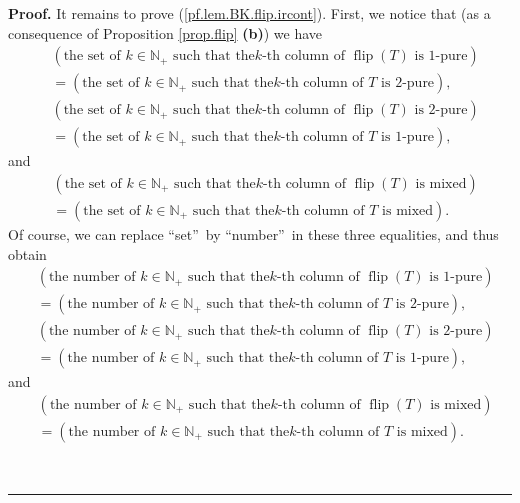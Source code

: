 \documentclass[numbers=enddot,12pt,final,onecolumn,notitlepage]{scrartcl}%
\theoremstyle{definition}
\newenvironment{proof}[1][Proof]{\noindent\textbf{#1.} }{\ \rule{0.5em}{0.5em}}
\begin{document}
\begin{proof}
It remains to prove (\ref{pf.lem.BK.flip.ircont}). First, we notice that (as a
consequence of Proposition \ref{prop.flip} \textbf{(b)}) we have
\begin{align*}
&  \left(  \text{the set of }k\in\mathbb{N}_{+}\text{ such that the
}k\text{-th column of }\operatorname*{flip}\left(  T\right)  \text{ is
1-pure}\right) \\
&  =\left(  \text{the set of }k\in\mathbb{N}_{+}\text{ such that the
}k\text{-th column of }T\text{ is 2-pure}\right)  ,
\end{align*}%
\begin{align*}
&  \left(  \text{the set of }k\in\mathbb{N}_{+}\text{ such that the
}k\text{-th column of }\operatorname*{flip}\left(  T\right)  \text{ is
2-pure}\right) \\
&  =\left(  \text{the set of }k\in\mathbb{N}_{+}\text{ such that the
}k\text{-th column of }T\text{ is 1-pure}\right)  ,
\end{align*}
and%
\begin{align*}
&  \left(  \text{the set of }k\in\mathbb{N}_{+}\text{ such that the
}k\text{-th column of }\operatorname*{flip}\left(  T\right)  \text{ is
mixed}\right) \\
&  =\left(  \text{the set of }k\in\mathbb{N}_{+}\text{ such that the
}k\text{-th column of }T\text{ is mixed}\right)  .
\end{align*}
Of course, we can replace \textquotedblleft set\textquotedblright\ by
\textquotedblleft number\textquotedblright\ in these three equalities, and
thus obtain%
\begin{align*}
&  \left(  \text{the number of }k\in\mathbb{N}_{+}\text{ such that the
}k\text{-th column of }\operatorname*{flip}\left(  T\right)  \text{ is
1-pure}\right) \\
&  =\left(  \text{the number of }k\in\mathbb{N}_{+}\text{ such that the
}k\text{-th column of }T\text{ is 2-pure}\right)  ,
\end{align*}%
\begin{align*}
&  \left(  \text{the number of }k\in\mathbb{N}_{+}\text{ such that the
}k\text{-th column of }\operatorname*{flip}\left(  T\right)  \text{ is
2-pure}\right) \\
&  =\left(  \text{the number of }k\in\mathbb{N}_{+}\text{ such that the
}k\text{-th column of }T\text{ is 1-pure}\right)  ,
\end{align*}
and%
\begin{align*}
&  \left(  \text{the number of }k\in\mathbb{N}_{+}\text{ such that the
}k\text{-th column of }\operatorname*{flip}\left(  T\right)  \text{ is
mixed}\right) \\
&  =\left(  \text{the number of }k\in\mathbb{N}_{+}\text{ such that the
}k\text{-th column of }T\text{ is mixed}\right)  .
\end{align*}



\end{proof}
\end{document}
